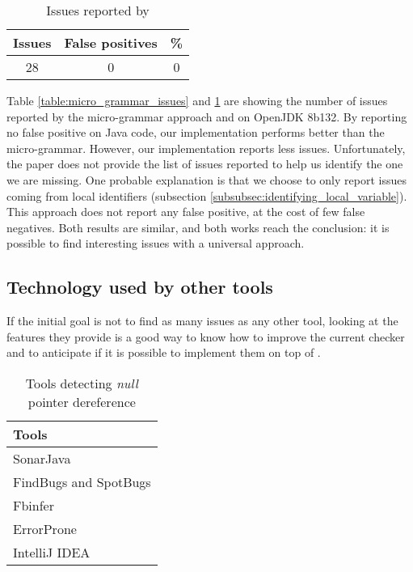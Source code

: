 \begin{table}[h]
	\centering
	\caption{Issues reported by \slang{}}
	\label{table:slang_issues_jdk8}
	\begin{tabular}{|c|c|c|}
		\hline
		\bf Issues & \bf False positives & \bf \% \\ \hline
		28 &  0 &  0 \\ \hline
	\end{tabular}
\end{table}

Table \ref{table:micro_grammar_issues} and \ref{table:slang_issues_jdk8} are showing the number of issues reported by the micro-grammar approach and \slang{} on OpenJDK 8b132.
By reporting no false positive on Java code, our implementation performs better than the micro-grammar.
However, our implementation reports less issues.
Unfortunately, the paper does not provide the list of issues reported to help us identify the one we are missing.
One probable explanation is that we choose to only report issues coming from local identifiers (subsection \ref{subsubsec:identifying_local_variable}).
This approach does not report any false positive, at the cost of few false negatives.
Both results are similar, and both works reach the conclusion: it is possible to find interesting issues with a universal approach.

\subsection{Technology used by other tools}
\label{subsec:other_tools_technology}

If the initial goal is not to find as many issues as any other tool, looking at the features they provide is a good way to know how to improve the current checker and to anticipate if it is possible to implement them on top of \slang{}.

\begin{table}[h]
	\centering
	\caption{Tools detecting \emph{null} pointer dereference}
	\label{table:tools_features}
	\begin{tabular}{|l|}
		\hline
		\bf Tools \\
		\hline
		SonarJava \cite{SonarJava:2019:Online} \\
		FindBugs \cite{Hovemeyer:2004:FBE:1052883.1052895} and SpotBugs \cite{spotBugs:2019:Online} \\
		Fbinfer \cite{fbInfer:2019:Online} \\
		ErrorProne \cite{errorProne:2019:Online} \\
		IntelliJ IDEA \cite{intelJIDEA:2019:Online} \\
		\hline    
	\end{tabular}
\end{table}

